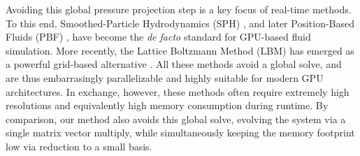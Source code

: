 Avoiding this global pressure projection step is a key focus of real-time methods. To this end, Smoothed-Particle Hydrodynamics (SPH) \cite{muller2003particle}, and later Position-Based Fluids (PBF) \cite{macklin2013pbf}, have become the \emph{de facto} standard for GPU-based fluid simulation. 
More recently, the Lattice Boltzmann Method (LBM) has emerged as a powerful grid-based alternative \cite{chen1998lattice, chen2021gpu, li2020fast}. All these methods avoid a global solve, and are thus embarrasingly parallelizable and highly suitable for modern GPU architectures. 
In exchange, however, these methods often require extremely high resolutions and equivalently high memory consumption during runtime. By comparison, our method also avoids this global solve, evolving the system via a single matrix vector multiply, while simultaneously keeping the memory footprint low via reduction to a small basis.





